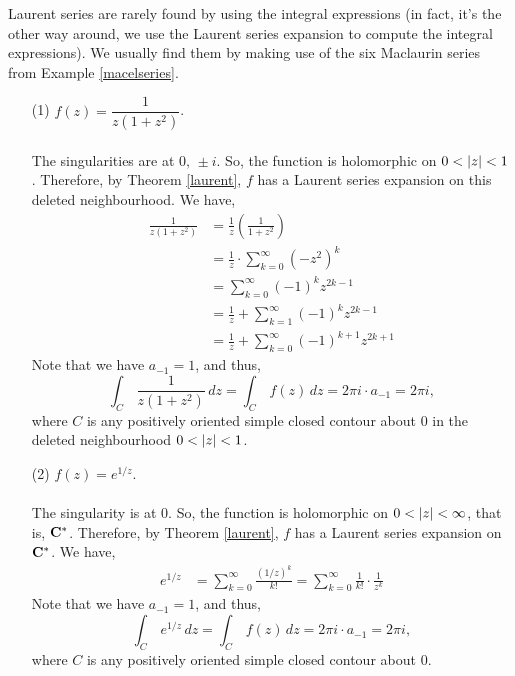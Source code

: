 \begin{example}\label{laurentex}
Laurent series are rarely found by using the integral expressions (in fact, it's the other way around, we use the Laurent series expansion to compute the integral expressions). We usually find them by making use of the six Maclaurin series from Example \ref{macelseries}. 
\begin{itemize}[itemsep=1em]
\item[(1)] $f(z) = \dfrac{1}{z(1 + z^2)}$.\\
\\
The singularities are at $0,\,\pm i$. So, the function is holomorphic on $0 < \left\lvert z\right\rvert< 1$. Therefore, by Theorem \ref{laurent}, $f$ has a Laurent series expansion on this deleted neighbourhood. We have,
\begin{align*}
\frac{1}{z(1 + z^2)} &= \frac{1}{z}\left(\frac{1}{1 + z^2}\right)\\[0.5em]
 &= \frac{1}{z}\cdot\sum_{k=0}^\infty(-z^2)^k\\[0.5em]
 &= \sum_{k=0}^\infty (-1)^kz^{2k-1}\\[0.5em]
 &= \frac{1}{z} + \sum_{k=1}^\infty (-1)^kz^{2k-1}\\[0.5em]
 &= \frac{1}{z} + \sum_{k=0}^\infty (-1)^{k+1}z^{2k+1}
\end{align*}
Note that we have $a_{-1} = 1$, and thus,
\[\int_C\,\frac{1}{z(1 + z^2)}\,dz = \int_C\,f(z)\,dz = 2\pi i\cdot a_{-1} = 2\pi i,\]
where $C$ is any positively oriented simple closed contour about $0$ in the deleted neighbourhood $0 < \left\lvert z\right\rvert < 1$.

\item[(2)] $f(z) = e^{1/z}$.\\
\\
The singularity is at $0$. So, the function is holomorphic on $0 < \left\lvert z\right\rvert< \infty$, that is, $\mathbf C^*$. Therefore, by Theorem \ref{laurent}, $f$ has a Laurent series expansion on $\mathbf C^*$. We have,
\begin{align*}
e^{1/z} &= \sum_{k=0}^\infty \frac{(1/z)^k}{k!} = \sum_{k=0}^\infty \frac{1}{k!}\cdot\frac{1}{z^k}
\end{align*}
Note that we have $a_{-1} = 1$, and thus,
\[\int_C\,e^{1/z}\,dz = \int_C\,f(z)\,dz = 2\pi i\cdot a_{-1} = 2\pi i,\]
where $C$ is any positively oriented simple closed contour about $0$.


\end{itemize}
\end{example}
